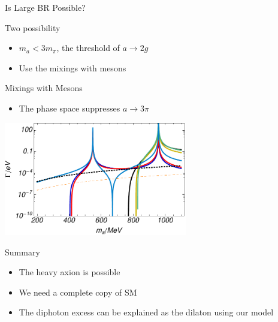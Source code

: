 \documentclass[17pt,ignorenonframetext,]{beamer}
\providecommand{\tightlist}{%
  \setlength{\itemsep}{0pt}\setlength{\parskip}{0pt}}
\begin{document}
\begin{frame}{Is Large BR Possible?}

\begin{block}{Two possibility}

\begin{itemize}
\tightlist
\item
  \(m_a < 3m_\pi\), the threshold of \(a\to2g\)
\item
  Use the mixings with mesons
\end{itemize}

\end{block}

\end{frame}

\begin{frame}{Mixings with Mesons}

\begin{itemize}
\tightlist
\item
  The phase space suppresses \(a\to3\pi\)
\end{itemize}

\begin{center}
\includegraphics[width=8cm]{width.pdf}
\end{center}

\end{frame}

\begin{frame}{Summary}

\begin{itemize}
\tightlist
\item
  The heavy axion is possible
\item
  We need a complete copy of SM
\item
  The diphoton excess can be explained as the dilaton using our model
\end{itemize}

\end{frame}
\end{document}
